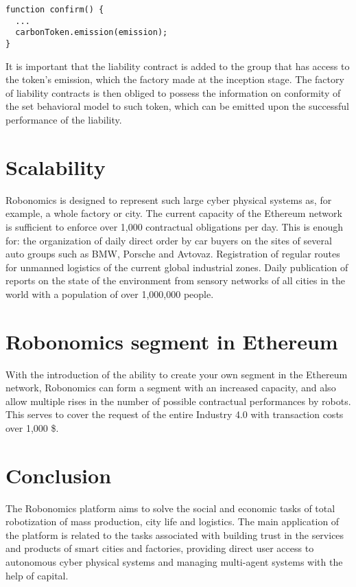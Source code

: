 \documentclass{article}
\begin{document}
\begin{lstlisting}
function confirm() {
  ... 
  carbonToken.emission(emission);
}
\end{lstlisting}

It is important that the liability contract is added to the group that has access to the token's emission, which the factory made at the inception stage. The factory of liability contracts is then obliged to possess the information on conformity of the set behavioral model to such token, which can be emitted upon the successful performance of the liability.

\section{Scalability}

Robonomics is designed to represent such large cyber physical systems as, for example, a whole factory or city. The current capacity of the Ethereum network is sufficient to enforce over 1,000 contractual obligations per day. This is enough for:
the organization of daily direct order by car buyers on the sites of several auto groups such as BMW, Porsche and Avtovaz.
Registration of regular routes for unmanned logistics of the current global industrial zones.
Daily publication of reports on the state of the environment from sensory networks of all cities in the world with a population of over 1,000,000 people.

\section{Robonomics segment in Ethereum}

With the introduction of the ability to create your own segment in the Ethereum network, Robonomics can form a segment with an increased capacity, and also allow multiple rises in the number of possible contractual performances by robots. This serves to cover the request of the entire Industry 4.0 with transaction costs over 1,000 \$.

\section{Conclusion}

The Robonomics platform aims to solve the social and economic tasks of total robotization of mass production, city life and logistics. The main application of the platform is related to the tasks associated with building trust in the services and products of smart cities and factories, providing direct user access to autonomous cyber physical systems and managing multi-agent systems with the help of capital.
\end{document}
